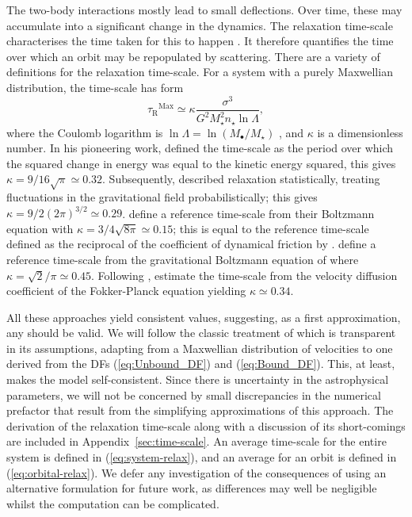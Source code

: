 \documentclass[useAMS,usedcolumn,usegraphicx,usenatbib]{mn2e}
\newcommand{\eqnref}[1]{(\ref{eq:#1})}
\newcommand{\apref}[1]{Appendix~\ref{sec:#1}}
\newcommand{\sub}[1]{\ensuremath{_\mathrm{#1}}}
\newcommand{\super}[1]{\ensuremath{^\mathrm{#1}}}
\begin{document}
The two-body interactions mostly lead to small deflections. Over time, these may accumulate into a significant change in the dynamics. The relaxation time-scale characterises the time taken for this to happen \citep[section 1.2.1]{Binney2008}. It therefore quantifies the time over which an orbit may be repopulated by scattering. There are a variety of definitions for the relaxation time-scale. For a system with a purely Maxwellian distribution, the time-scale has form
\begin{equation}
\tau\sub{R}\super{Max} \simeq \kappa\frac{\sigma^3}{G^2M_\star^2 n_\star\ln\Lambda},
\label{eq:tauMaxwell}
\end{equation}
where the Coulomb logarithm is $\ln\Lambda = \ln(M_\bullet/M_\star)$ \citep{Bahcall1976}, and $\kappa$ is a dimensionless number. In his pioneering work, \citet{Chandrasekhar1941, Chandrasekhar1960} defined the time-scale as the period over which the squared change in energy was equal to the kinetic energy squared, this gives $\kappa = 9/16\sqrt{\pi} \simeq 0.32$. Subsequently, \citet{Chandrasekhar1941a} described relaxation statistically, treating fluctuations in the gravitational field probabilistically; this gives $\kappa = 9/2(2\pi)^{3/2} \simeq 0.29$. \citet{Bahcall1977} define a reference time-scale from their Boltzmann equation with $\kappa = 3/4\sqrt{8\pi} \simeq 0.15$; this is equal to the reference time-scale defined as the reciprocal of the coefficient of dynamical friction by \citet{Chandrasekhar1943a, Chandrasekhar1943}. \citet{Spitzer1958} define a reference time-scale from the gravitational Boltzmann equation of \citet{Spitzer1951} where $\kappa = \sqrt{2}/\pi \simeq 0.45$. Following \citet{Spitzer1971}, \citet[section 7.4.5]{Binney2008} estimate the time-scale from the velocity diffusion coefficient of the Fokker-Planck equation yielding $\kappa \simeq 0.34$.

All these approaches yield consistent values, suggesting, as a first approximation, any should be valid. We will follow the classic treatment of \citet[chapter 2]{Chandrasekhar1960} which is transparent in its assumptions, adapting from a Maxwellian distribution of velocities to one derived from the DFs \eqnref{Unbound_DF} and \eqnref{Bound_DF}. This, at least, makes the model self-consistent. Since there is uncertainty in the astrophysical parameters, we will not be concerned by small discrepancies in the numerical prefactor that result from the simplifying approximations of this approach. The derivation of the relaxation time-scale along with a discussion of its short-comings are included in \apref{time-scale}. An average time-scale for the entire system is defined in \eqnref{system-relax}, and an average for an orbit is defined in \eqnref{orbital-relax}. We defer any investigation of the consequences of using an alternative formulation for future work, as differences may well be negligible whilst the computation can be complicated.
\end{document}
